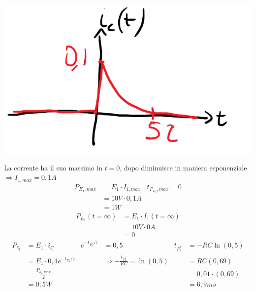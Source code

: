 \documentclass{article}
\begin{document}
\begin{center}
    \includegraphics[scale=0.35]{Image/Es_1_Trans_2.png}
\end{center}
La corrente ha il suo massimo in $t=0$, dopo diminuisce in maniera esponenziale $\Rightarrow I_{1,max} = 0,1 A$
\begin{align*}
    P_{E_1,max} &= E_1 \cdot I_{1,max} & t_{P_{E_1}, max} = 0 \\
    &=10 V \cdot 0,1 A \\
    &=1 W
\end{align*}
\begin{align*}
    P_{E_1}(t=\infty) &= E_1 \cdot I_1(t=\infty)\\
    &=10V \cdot 0A\\
    &=0
\end{align*}
\begin{align*}
    P_{\delta_1} &= E_1 \cdot i_C & e^{-t_{P^*_\delta}/\tau} &=0,5 & t_{P^*_\delta} &=-RC \ln(0,5) \\
    &= E_1 \cdot  0,1 e^{-t_{P_\delta}/\tau} & &\Rightarrow -\frac{t_{P^*_\delta}}{RC} = \ln(0,5) & &=RC(0,69)\\
    &= \frac{P_{\delta_1, max}}{2}  & & & &=0,01\cdot(0,69) \\
    &=0,5W &  & & &=6,9ms
\end{align*}
\end{document}
